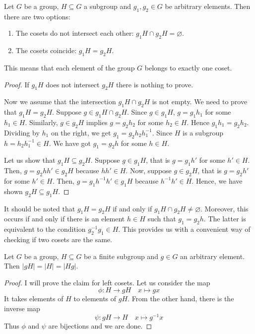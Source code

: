 \begin{claim}
\label{claim::cosets_disj}
Let $G$ be a group, $H\subseteq G$ a subgroup and $g_1, g_2\in G$ be arbitrary elements.
Then there are two options:
\begin{enumerate}
\item The cosets do not intersect each other: $g_1 H \cap g_2 H = \varnothing$.

\item The cosets coincide: $g_1 H = g_2 H$.
\end{enumerate}
This means that each element of the group $G$ belongs to exactly one coset.
\end{claim}
\begin{proof}
If $g_1H$ does not intersect $g_2H$ there is nothing to prove.

Now we assume that the intersection $g_1 H\cap g_2 H$ is not empty.
We need to prove that $g_1 H = g_2 H$.
Suppose $g\in g_1 H \cap g_2H$.
Since $g\in g_1H$, $g = g_1 h_1$ for some $h_1\in H$.
Similarly, $g\in g_2H$ implies $g = g_2 h_2$ for some $h_2\in H$.
Hence $g_1 h_1 = g_2 h_2$.
Dividing by $h_1$ on the right, we get $g_1 = g_2 h_2 h_1^{-1}$.
Since $H$ is a subgroup $h = h_2 h_1^{-1}\in H$.
We have got $g_1 = g_2 h$ for some $h\in H$.

Let us show that $g_1 H \subseteq g_2 H$.
Suppose $g\in g_1H$, that is $g = g_1 h'$ for some $h'\in H$.
Then, $g =g_2 h h'\in g_2 H$ because $hh'\in H$.
Now, suppose $g\in g_2H$, that is $g = g_2 h'$ for some $h'\in H$.
Then, $g = g_1 h^{-1}h'\in g_1 H$ because $h^{-1}h'\in H$.
Hence, we have shown $g_2 H \subseteq g_1 H$.
\end{proof}

\begin{remark}
It should be noted that $g_1 H  = g_2H$ if and only if $g_1 H \cap g_2 H \neq \varnothing$.
Moreover, this occurs if and only if there is an element $h\in H$ such that $g_1 = g_2 h$.
The latter is equivalent to the condition $g_2^{-1}g_1 \in H$.
This provides us with a convenient way of checking if two cosets are the same.
\end{remark}

\begin{claim}
\label{claim::cosets_size}
Let $G$ be a group, $H\subseteq G$ be a finite subgroup and $g\in G$ an arbitrary element.
Then $|gH| = |H| = |Hg|$.
\end{claim}
\begin{proof}
I will prove the claim for left cosets.
Let us consider the map
\[
\phi \colon H \to g H\quad x \mapsto gx
\]
It takes elements of $H$ to elements of $gH$.
From the other hand, there is the inverse map
\[
\psi \colon gH \to H\quad x \mapsto g^{-1}x
\]
Thus $\phi$ and $\psi$ are bijections and we are done.
\end{proof}

